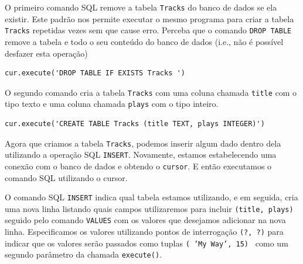 O primeiro comando SQL remove a tabela {\tt Tracks} do banco de dados se ela
existir. Este padrão nos permite executar o mesmo programa para criar a tabela
{\tt Tracks} repetidas vezes sem que cause erro. Perceba que o comando {\tt DROP
  TABLE} remove a tabela e todo o seu conteúdo do banco de dados (i.e., não é
possível desfazer esta operação)

\beforeverb
\begin{verbatim}
cur.execute('DROP TABLE IF EXISTS Tracks ')
\end{verbatim}
\afterverb
%
%
O segundo comando cria a tabela {\tt Tracks} com uma coluna chamada {\tt title}
com o tipo texto e uma coluna chamada {\tt plays} com o tipo inteiro.

\beforeverb
\begin{verbatim}
cur.execute('CREATE TABLE Tracks (title TEXT, plays INTEGER)')
\end{verbatim}
\afterverb
%
%
Agora que criamos a tabela {\tt Tracks}, podemos inserir algum dado dentro
dela utilizando a operação SQL {\tt INSERT}. Novamente, estamos
estabelecendo uma conexão com o banco de dados e obtendo o {\tt cursor}.
E então executamos o comando SQL utilizando o cursor.


O comando SQL {\tt INSERT} indica qual tabela estamos utilizando, e em seguida, 
cria uma nova linha listando quais campos utilizaremos para incluir {\tt (title,
  plays)} seguido pelo comando {\tt VALUES} com os valores que desejamos
adicionar na nova linha. Especificamos os valores utilizando pontos de
interrogação {\tt (?, ?)} para indicar que os valores serão passados como
tuplas {\tt ( 'My Way', 15) } como um segundo parâmetro da chamada
{\tt execute()}.

